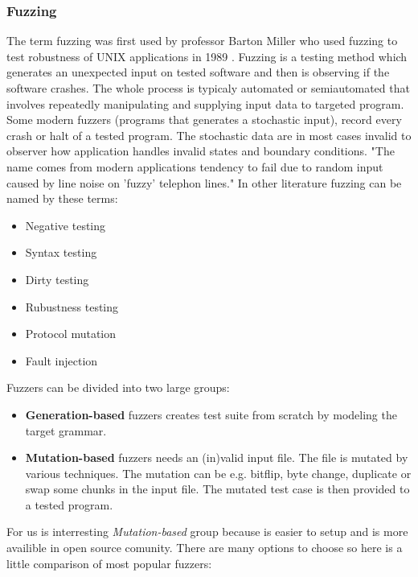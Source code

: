 \subsubsection{Fuzzing}
\label{fuzzing}
The term fuzzing was first used by professor Barton Miller who used fuzzing to
test robustness of UNIX applications in 1989 \cite{Takanen:2008:FSS:1404500,
Marhefka2013}. Fuzzing is a testing method which generates an unexpected input
on tested software and then is observing if the software crashes. The whole
process is typicaly automated or semiautomated that involves repeatedly
manipulating and supplying input data to targeted program. Some modern fuzzers
(programs that generates a stochastic input), record every crash or halt of a
tested program. The stochastic data are in most cases invalid to observer how
application handles invalid states and boundary conditions. "The name comes from
modern applications tendency to fail due to random input caused by line noise on
'fuzzy' telephon lines."\cite{Takanen:2008:FSS:1404500, N2LYDLnqzEFYp0wM,
takanen2009fuzzing} In other literature fuzzing can be named by these terms:
\begin{itemize}
	\item Negative testing
	\item Syntax testing
	\item Dirty testing
	\item Rubustness testing
	\item Protocol mutation
	\item Fault injection
\end{itemize}

\noindent
Fuzzers can be divided into two large groups:

\begin{itemize}
	\item \textbf{Generation-based} fuzzers creates test suite from scratch by modeling the target grammar.
	\item \textbf{Mutation-based} fuzzers needs an (in)valid input file. The file is mutated by various techniques.
	The mutation can be e.g. bitflip, byte change, duplicate or swap some chunks in the input file.
	The mutated test case is then provided to a tested program.
\end{itemize}

For us is interresting \emph{Mutation-based} group because is easier to setup and
is more availible in open source comunity. There are many options to choose so here is
a little comparison of most popular fuzzers:

